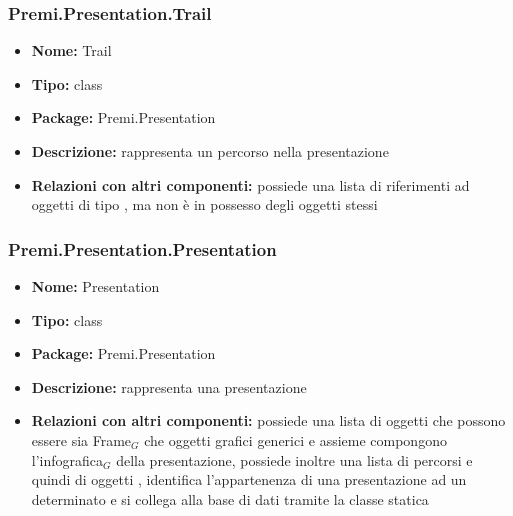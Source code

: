 \subsubsection{Premi.Presentation.Trail}
\begin{itemize}
  \item \textbf{Nome:} Trail
  \item \textbf{Tipo:} class
  \item \textbf{Package:} Premi.Presentation
  \item \textbf{Descrizione:} rappresenta un percorso nella presentazione
  \item \textbf{Relazioni con altri componenti:} possiede una lista di riferimenti ad oggetti di tipo , ma non è in possesso degli oggetti stessi
\end{itemize}
\subsubsection{Premi.Presentation.Presentation}
\begin{itemize}
  \item \textbf{Nome:} Presentation
  \item \textbf{Tipo:} class
  \item \textbf{Package:} Premi.Presentation
  \item \textbf{Descrizione:} rappresenta una presentazione
  \item \textbf{Relazioni con altri componenti:} possiede una lista di oggetti  che possono essere sia Frame$_G$ che oggetti grafici generici e assieme compongono l'infografica$_G$ della presentazione, possiede inoltre una lista di percorsi e quindi di oggetti , identifica l'appartenenza di una presentazione ad un determinato  e si collega alla base di dati tramite la classe statica 
\end{itemize}


\clearpage
